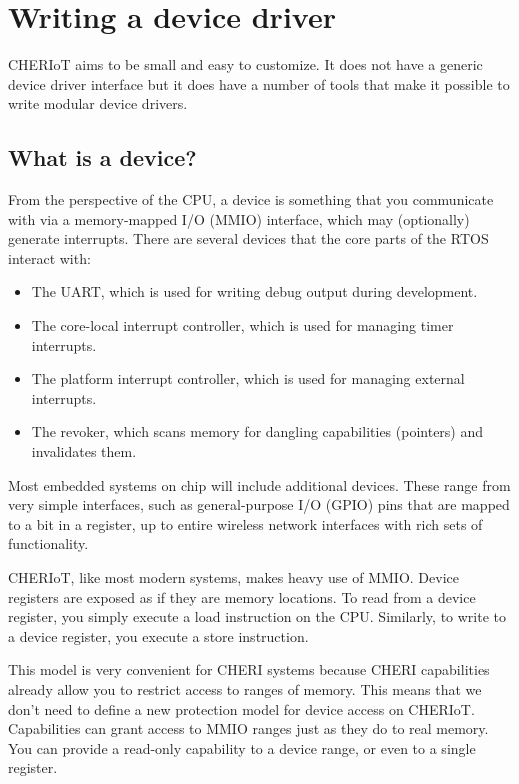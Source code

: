\chapter[label=drivers]{Writing a device driver}

CHERIoT aims to be small and easy to customize.
It does not have a generic device driver interface but it does have a number of tools that make it possible to write modular device drivers.

\section{What is a device?}

From the perspective of the CPU, a device is something that you communicate with via a memory-mapped I/O (MMIO) interface, which may (optionally) generate interrupts.
There are several devices that the core parts of the RTOS interact with:

\begin{itemize}
	\item{The UART, which is used for writing debug output during development.}
	\item{The core-local interrupt controller, which is used for managing timer interrupts.}
	\item{The platform interrupt controller, which is used for managing external interrupts.}
	\item{The revoker, which scans memory for dangling capabilities (pointers) and invalidates them.}
\end{itemize}

Most embedded systems on chip will include additional devices.
These range from very simple interfaces, such as general-purpose I/O (GPIO) pins that are mapped to a bit in a register, up to entire wireless network interfaces with rich sets of functionality.

CHERIoT, like most modern systems, makes heavy use of MMIO.
Device registers are exposed as if they are memory locations.
To read from a device register, you simply execute a load instruction on the CPU.
Similarly, to write to a device register, you execute a store instruction.

This model is very convenient for CHERI systems because CHERI capabilities already allow you to restrict access to ranges of memory.
This means that we don't need to define a new protection model for device access on CHERIoT.
Capabilities can grant access to MMIO ranges just as they do to real memory.
You can provide a read-only capability to a device range, or even to a single register.

